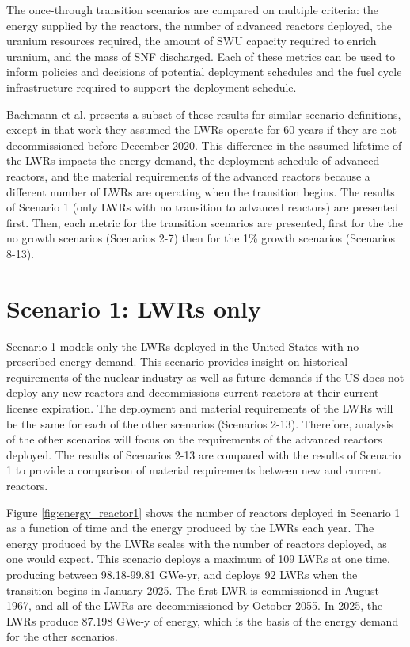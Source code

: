 The once-through transition scenarios are compared on multiple 
criteria: the energy supplied by the reactors, the number of 
advanced reactors deployed, the uranium resources required, the 
amount of \gls{SWU} capacity required to enrich uranium, and the 
mass of \gls{SNF} discharged. Each of these metrics can be used to inform 
policies and decisions of potential deployment schedules and the 
fuel cycle infrastructure required to support the deployment schedule. 

Bachmann et al. \cite{bachmann_enrichment_2021} presents a subset of 
these results for similar scenario definitions, except in that work 
they assumed the 
\glspl{LWR} operate for 60 years if they are not decommissioned before December 
2020. This difference in 
the assumed lifetime of the \glspl{LWR} impacts the energy demand, 
the deployment schedule of advanced reactors, and the material 
requirements of the advanced reactors because a different number of 
\glspl{LWR} are operating when the transition begins. The results of 
Scenario 1 (only \glspl{LWR} with no transition to advanced reactors) 
are presented first. Then, each metric for the transition scenarios are 
presented, first for the the no growth scenarios 
(Scenarios 2-7) then for the 1\% growth scenarios (Scenarios 
8-13).

\section{Scenario 1: LWRs only}\label{sec:scenario1}
Scenario 1 models only the \glspl{LWR} deployed in the United States with no 
prescribed energy demand. This scenario provides insight on historical 
requirements of the nuclear industry as well as future demands if the 
US does not deploy any new reactors and decommissions current reactors at 
their current license expiration. The 
deployment and material requirements of the \glspl{LWR} will be the same 
for each of the other scenarios (Scenarios 2-13). Therefore, analysis 
of the other scenarios will focus on the requirements of 
the advanced reactors deployed. The results of Scenarios 2-13 
are compared with the results of Scenario 1 to provide a comparison 
of material requirements between new and current reactors. 

Figure \ref{fig:energy_reactor1} shows the number of 
reactors deployed in Scenario 1 as a function of time and the energy 
produced by the \glspl{LWR} each year. The energy produced by the 
\glspl{LWR} scales with the number of reactors deployed, as 
one would expect. This scenario deploys a maximum of 109 
\glspl{LWR} at one time, producing 
between 98.18-99.81 GWe-yr, and deploys 92 \glspl{LWR}
when the transition begins in January 2025. The first \gls{LWR} is 
commissioned in August 1967, and all of the \glspl{LWR} are
decommissioned by October 2055. In 2025, the \glspl{LWR} produce 
87.198 GWe-y of energy, which is the basis of the energy demand for 
the other scenarios. 

